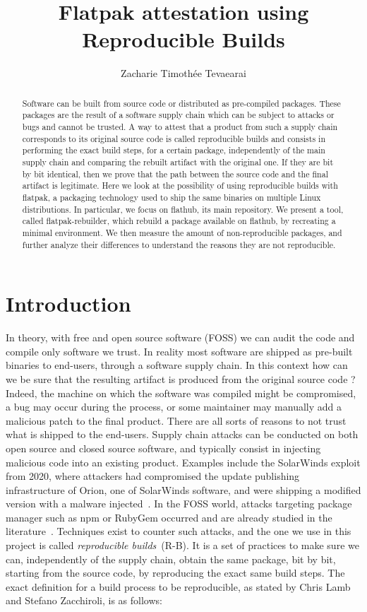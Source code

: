 \documentclass[a4paper,11pt,oneside]{report}
\title{Flatpak attestation using Reproducible Builds}
\author{Zacharie Timothée Tevaearai}
\theoremstyle{definition}
\newcommand{\sysname}{flatpak-rebuilder\xspace}
\newcommand{\rb}{reproducible builds\xspace}
\newcommand{\fp}{flatpak\xspace}
\newcommand{\fh}{flathub\xspace}
\begin{document}
\maketitle

\begin{abstract}
Software can be built from source code or distributed as pre-compiled packages.
These packages are the result of a software supply chain which can be
subject to attacks or bugs and cannot be trusted. A way to attest that a
product from such a supply chain corresponds to its original source code is
called \rb and consists in performing the exact build steps, for a certain
package, independently of the main supply chain and comparing the rebuilt
artifact with the original one. If they are bit by bit identical, then we
prove that the path between the source code and the final artifact is
legitimate. Here we look at the possibility of using reproducible builds
with \fp, a packaging technology used to ship the same binaries on multiple
Linux distributions. In particular, we focus on \fh, its main repository.
We present a tool, called \sysname, which rebuild a package available on
\fh, by recreating a minimal environment. We then measure the amount of
non-reproducible packages, and further analyze their differences to
understand the reasons they are not reproducible.
\end{abstract}

\maketoc

\chapter{Introduction}


In theory, with free and open source software (FOSS) we can audit the code and
compile only software we trust. In reality most software are shipped as
pre-built binaries to end-users, through a software supply chain. In this
context how can we be sure that the resulting artifact is produced from the
original source code ? Indeed, the machine on which the software was compiled
might be compromised, a bug may occur during the process, or some maintainer
may manually add a malicious patch to the final product. There are all sorts of
reasons to not trust what is shipped to the end-users. Supply chain attacks can
be conducted on both open source and closed source software, and typically
consist in injecting malicious code into an existing product. Examples include
the SolarWinds exploit from 2020, where attackers had compromised the update
publishing infrastructure of Orion, one of SolarWinds software, and were
shipping a modified version with a malware injected~\cite{enwiki:solarwinds}.
In the FOSS world, attacks targeting package manager such as npm or RubyGem
occurred and are already studied in the
literature~\cite{10.1007/978-3-030-52683-2_2}.
Techniques exist to counter such attacks, and the one we use in this project is
called \emph{\rb}~(R-B). It is a set of practices to make sure we can,
independently of the supply chain, obtain the same package, bit by bit,
starting from the source code, by reproducing the exact same build steps. The
exact definition for a build process to be reproducible, as stated by Chris
Lamb and Stefano Zacchiroli, is as follows:
\end{document}
